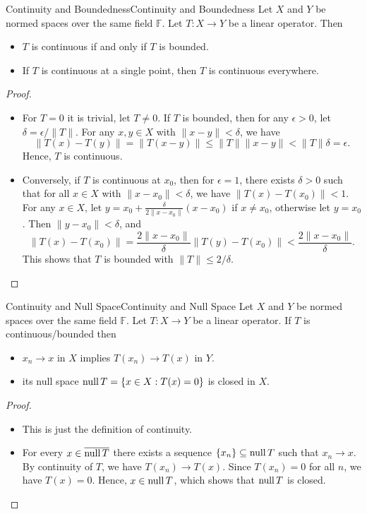 \documentclass[../main.tex]{subfiles}
\begin{document}
\begin{theorem}{Continuity and Boundedness}{Continuity and Boundedness}
	Let $X$ and $Y$ be normed spaces over the same field $\mathbb{F}$. Let $T: X \rightarrow Y$ be a linear operator. Then
	\begin{itemize}
		\item $T$ is continuous if and only if $T$ is bounded.
		\item If $T$ is continuous at a single point, then $T$ is continuous everywhere.
	\end{itemize}
\end{theorem}
\begin{proof}
\begin{itemize}
	\item For $T=0$ it is trivial, let $T\neq 0$. If $T$ is bounded, then for any $\epsilon > 0$, let $\delta = \epsilon / \|T\|$. For any $x, y \in X$ with $\|x - y\| < \delta$, we have
		\begin{equation*}
			\|T(x) - T(y)\| = \|T(x - y)\| \leq \|T\| \|x - y\| < \|T\| \delta = \epsilon.
		\end{equation*}
		Hence, $T$ is continuous.

	\item Conversely, if $T$ is continuous at $x_0$, then for $\epsilon = 1$, there exists $\delta > 0$ such that for all $x \in X$ with $\|x - x_0\| < \delta$, we have $\|T(x) - T(x_0)\| < 1$. For any $x \in X$, let $y = x_0 + \frac{\delta}{2\|x - x_0\|}(x - x_0)$ if $x \neq x_0$, otherwise let $y = x_0$. Then $\|y - x_0\| < \delta$, and
		\begin{equation*}
			\|T(x) - T(x_0)\| = \frac{2\|x - x_0\|}{\delta} \|T(y) - T(x_0)\| < \frac{2\|x - x_0\|}{\delta}.
		\end{equation*}
		This shows that $T$ is bounded with $\|T\| \leq 2/\delta$.
\end{itemize}
\end{proof}

\begin{corollary}{Continuity and Null Space}{Continuity and Null Space}
	Let $X$ and $Y$ be normed spaces over the same field $\mathbb{F}$. Let $T: X \rightarrow Y$ be a linear operator. If $T$ is continuous/bounded then 
	\begin{itemize}
		\item $x_n \rightarrow x$ in $X$ implies $T(x_n) \rightarrow T(x)$ in $Y$.
		\item its null space $\operatorname{null} T = \{x \in X : T(x) = 0\}$ is closed in $X$. 
	\end{itemize}
\end{corollary}
\begin{proof}
\begin{itemize}
	\item This is just the definition of continuity.
	\item For every $x\in \overline{\operatorname{null} T}$ there exists a sequence $\{x_n\}\subseteq \operatorname{null} T$ such that $x_n\rightarrow x$. By continuity of $T$, we have $T(x_n)\rightarrow T(x)$. Since $T(x_n) = 0$ for all $n$, we have $T(x) = 0$. Hence, $x\in \operatorname{null} T$, which shows that $\operatorname{null} T$ is closed.
\end{itemize}
\end{proof}
\end{document}
